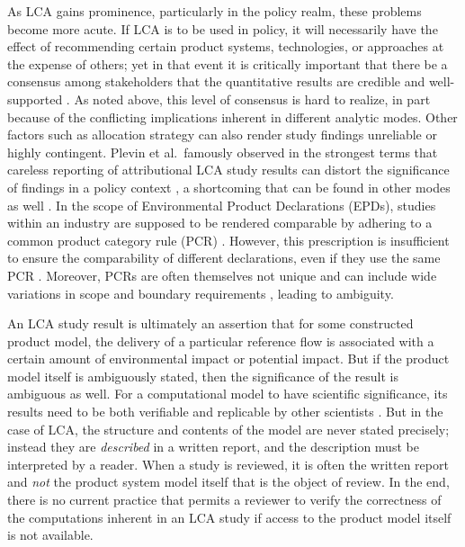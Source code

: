 As LCA gains prominence, particularly in the policy realm, these problems become more acute.  If LCA is to be used in policy, it will necessarily have the effect of recommending certain product systems, technologies, or approaches at the expense of others; yet in that event it is critically important that there be a consensus among stakeholders that the quantitative results are credible and well-supported \citep{Rainville_2015, McManus_2015}.  As noted above, this level of consensus is hard to realize, in part because of the conflicting implications inherent in different analytic modes.
Other factors such as allocation strategy \citep{Pelletier_2014} can also render study findings unreliable or highly contingent.  Plevin et al.\ famously observed in the strongest terms that careless reporting of attributional LCA study results can distort the significance of findings in a policy context \citep{Plevin_2013}, a shortcoming that can be found in other modes as well \citep{Brandao_2014}.  In the scope of Environmental Product Declarations (EPDs), studies within an industry are supposed to be rendered comparable by adhering to a common product category rule (PCR) \citep{Fet_2006}.  However, this prescription is insufficient to ensure the comparability of different declarations, even if they use the same PCR \citep{Modahl_2012}.  Moreover, PCRs are often themselves not unique and can include wide variations in scope and boundary requirements \citep{Subramanian_2012}, leading to ambiguity.  

An LCA study result is ultimately an assertion that for some constructed product model, the delivery of a particular reference flow is associated with a certain amount of environmental impact or potential impact.  But if the product model itself is ambiguously stated, then the significance of the result is ambiguous as well.  For a computational model to have scientific significance, its results need to be both verifiable and replicable by other scientists \citep{Fomel_2009, Mesirov_2010}.  But in the case of LCA, the structure and contents of the model are never stated precisely; instead they are \emph{described} in a written report, and the description must be interpreted by a reader.  When a study is reviewed, it is often the written report and \emph{not} the product system model itself that is the object of review.  In the end, there is no current practice that permits a reviewer to verify the correctness of the computations inherent in an LCA study if access to the product model itself is not available.

